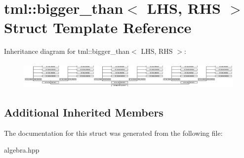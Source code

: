 \hypertarget{structtml_1_1bigger__than}{\section{tml\+:\+:bigger\+\_\+than$<$ L\+H\+S, R\+H\+S $>$ Struct Template Reference}
\label{structtml_1_1bigger__than}
}
Inheritance diagram for tml\+:\+:bigger\+\_\+than$<$ L\+H\+S, R\+H\+S $>$\+:\begin{figure}[H]
\begin{center}
\leavevmode
\includegraphics[height=1.361111cm]{structtml_1_1bigger__than}
\end{center}
\end{figure}
\subsection*{Additional Inherited Members}


The documentation for this struct was generated from the following file\+:\begin{DoxyCompactItemize}
\item 
algebra.\+hpp\end{DoxyCompactItemize}

